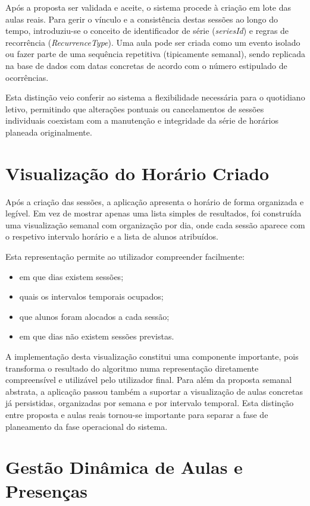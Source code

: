 Após a proposta ser validada e aceite, o sistema procede à criação em lote das aulas reais. Para gerir o vínculo e a consistência destas sessões ao longo do tempo, introduziu-se o conceito de identificador de série (\textit{seriesId}) e regras de recorrência (\textit{RecurrenceType}). Uma aula pode ser criada como um evento isolado ou fazer parte de uma sequência repetitiva (tipicamente semanal), sendo replicada na base de dados com datas concretas de acordo com o número estipulado de ocorrências.

Esta distinção veio conferir ao sistema a flexibilidade necessária para o quotidiano letivo, permitindo que alterações pontuais ou cancelamentos de sessões individuais coexistam com a manutenção e integridade da série de horários planeada originalmente.

\section{Visualização do Horário Criado}

Após a criação das sessões, a aplicação apresenta o horário de forma organizada e legível.
Em vez de mostrar apenas uma lista simples de resultados, foi construída uma visualização semanal com organização por dia,
onde cada sessão aparece com o respetivo intervalo horário e a lista de alunos atribuídos.

Esta representação permite ao utilizador compreender facilmente:

\begin{itemize}
    \item em que dias existem sessões;
    \item quais os intervalos temporais ocupados;
    \item que alunos foram alocados a cada sessão;
    \item em que dias não existem sessões previstas.
\end{itemize}

A implementação desta visualização constitui uma componente importante, pois transforma o resultado do algoritmo
numa representação diretamente compreensível e utilizável pelo utilizador final.
Para além da proposta semanal abstrata, a aplicação passou também a suportar a visualização de aulas concretas já persistidas, organizadas por semana e por intervalo temporal. Esta distinção entre proposta e aulas reais tornou-se importante para separar a fase de planeamento da fase operacional do sistema.

\section{Gestão Dinâmica de Aulas e Presenças}

